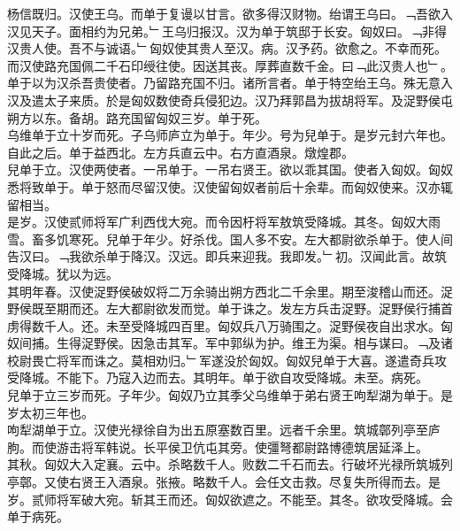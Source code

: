 \documentclass{zhvt-classic}
\begin{document}
\hspace*{2em}杨信既归。汉使王乌。而单于复谩以甘言。欲多得汉财物。绐谓王乌曰。﹁吾欲入汉见天子。面相约为兄弟。﹂王乌归报汉。汉为单于筑邸于长安。匈奴曰。﹁非得汉贵人使。吾不与诚语。﹂匈奴使其贵人至汉。病。汉予药。欲愈之。不幸而死。而汉使路充国佩二千石印绶往使。因送其丧。厚葬直数千金。曰﹁此汉贵人也﹂。单于以为汉杀吾贵使者。乃留路充国不归。诸所言者。单于特空绐王乌。殊无意入汉及遣太子来质。於是匈奴数使奇兵侵犯边。汉乃拜郭昌为拔胡将军。及浞野侯屯朔方以东。备胡。路充国留匈奴三岁。单于死。\\
\hspace*{2em}乌维单于立十岁而死。子乌师庐立为单于。年少。号为兒单于。是岁元封六年也。自此之后。单于益西北。左方兵直云中。右方直酒泉。燉煌郡。\\
\hspace*{2em}兒单于立。汉使两使者。一吊单于。一吊右贤王。欲以乖其国。使者入匈奴。匈奴悉将致单于。单于怒而尽留汉使。汉使留匈奴者前后十余辈。而匈奴使来。汉亦辄留相当。\\
\hspace*{2em}是岁。汉使贰师将军广利西伐大宛。而令因杅将军敖筑受降城。其冬。匈奴大雨雪。畜多饥寒死。兒单于年少。好杀伐。国人多不安。左大都尉欲杀单于。使人间告汉曰。﹁我欲杀单于降汉。汉远。即兵来迎我。我即发。﹂初。汉闻此言。故筑受降城。犹以为远。\\
\hspace*{2em}其明年春。汉使浞野侯破奴将二万余骑出朔方西北二千余里。期至浚稽山而还。浞野侯既至期而还。左大都尉欲发而觉。单于诛之。发左方兵击浞野。浞野侯行捕首虏得数千人。还。未至受降城四百里。匈奴兵八万骑围之。浞野侯夜自出求水。匈奴间捕。生得浞野侯。因急击其军。军中郭纵为护。维王为渠。相与谋曰。﹁及诸校尉畏亡将军而诛之。莫相劝归。﹂军遂没於匈奴。匈奴兒单于大喜。遂遣奇兵攻受降城。不能下。乃寇入边而去。其明年。单于欲自攻受降城。未至。病死。\\
\hspace*{2em}兒单于立三岁而死。子年少。匈奴乃立其季父乌维单于弟右贤王呴犁湖为单于。是岁太初三年也。\\
\hspace*{2em}呴犁湖单于立。汉使光禄徐自为出五原塞数百里。远者千余里。筑城鄣列亭至庐朐。而使游击将军韩说。长平侯卫伉屯其旁。使彊弩都尉路博德筑居延泽上。\\
\hspace*{2em}其秋。匈奴大入定襄。云中。杀略数千人。败数二千石而去。行破坏光禄所筑城列亭鄣。又使右贤王入酒泉。张掖。略数千人。会任文击救。尽复失所得而去。是岁。贰师将军破大宛。斩其王而还。匈奴欲遮之。不能至。其冬。欲攻受降城。会单于病死。\\
\end{document}
